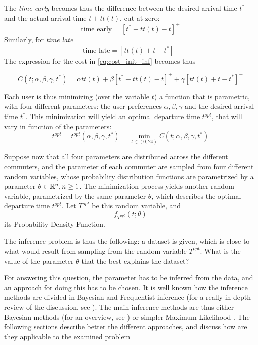 The \textit{time early} becomes thus the difference between the desired arrival time \(t^*\) and the actual arrival time \(t + tt(t)\), cut at zero:
\[\text{time early} = [t^* - tt(t) - t]^+\]
Similarly, for \textit{time late}
\[\text{time late} = [tt(t) + t - t^*]^+\]
The expression for the cost in \eqref{eq:cost_init_inf} becomes thus

\begin{equation}
  \label{eq:cost_inf}
  C(t; \alpha, \beta, \gamma, t^*) = \alpha tt(t) + \beta[t^* - tt(t) - t]^+ + \gamma[tt(t) + t - t^*]^+
\end{equation}

Each user is thus minimizing (over the variable \(t\))
a function that is parametric, with four different parameters:
the user preferences \(\alpha, \beta, \gamma\) and the desired arrival time \(t^*\).
This minimization will yield an optimal departure time \(t^{opt}\),
that will vary in function of the parameters:
\begin{equation}
  \label{eq:t_opt}
  t^{opt} = t^{opt}(\alpha, \beta, \gamma, t^*) = \min_{t \in (0, 24)} C(t; \alpha, \beta, \gamma, t^*)
\end{equation}

Suppose now that all four parameters are distributed across the different commuters,
and the parameter of each commuter are sampled from four different random variables,
whose probability distribution functions  are parametrized by a parameter \(\theta \in \mathbb{R}^n, n \geq 1\).
The minimization process yields another random variable, parametrized by the same parameter \(\theta\),
which describes the optimal departure time \(t^{opt}\).
Let \(T^{opt}\) be this random variable, and
\begin{equation}
  \label{eq:pdf_opt}
  f_{T^{opt}}(t; \theta)
\end{equation}
its Probability Density Function.

The inference problem is thus the following:
a dataset is given,
which is close to what would result from sampling from the random variable \(T^{opt}\).
What is the value of the parameter \(\theta\) that the best explains the dataset?

For answering this question, the parameter has to be inferred from the data,
and an approach for doing this has to be chosen.
It is well known how the inference methods are divided in Bayesian and Frequentist inference
(for a really in-depth review of the discussion, see \cite{bandyopadhyay2011philosophy}).
The main inference methods are thus either Bayesian methods (for an overview, see \cite{gelman2013bayesian}) or simpler Maximum Likelihood \parencite{doi:10.1098/rsta.1922.0009}.
The following sections describe better the different approaches,
and discuss how are they applicable to the examined problem

